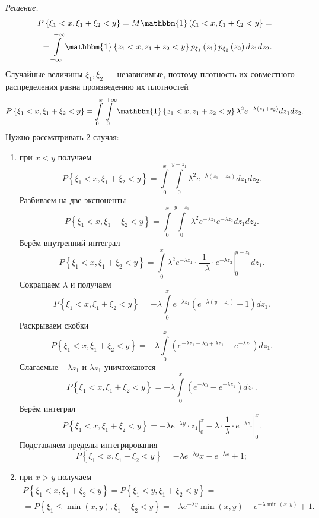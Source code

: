 \textit{Решение.} 
\begin{equation*}
\begin{split}
P \left\{ \xi_1 < x, \xi_1 + \xi_2 < y \right\} =
M \mathbbm{1} \left( \xi_1 < x, \xi_1 + \xi_2 < y \right\} = \\
= \int \limits_{- \infty }^{+ \infty } \mathbbm{1} \left\{ z_1 < x, z_1 + z_2 < y \right\} p_{ \xi_1} \left( z_1 \right) p_{ \xi_2} \left( z_2 \right) dz_1 dz_2.
\end{split}
\end{equation*}
Случайные величины $ \xi_1, \xi_2$ --- независимые, поэтому плотность их совместного распределения равна произведению их плотностей
$$P \left\{ \xi_1 < x, \xi_1 + \xi_2 < y \right\} =
\int \limits_0^x \int \limits_0^{+ \infty } \mathbbm{1} \left\{ z_1 < x, z_1 + z_2 < y \right\} \lambda^2 e^{- \lambda \left( z_1 + z_2 \right) } dz_1 dz_2.$$
Нужно рассматривать 2 случая:
\begin{enumerate}
\item при $x < y$ получаем
$$P \left\{ \xi_1 < x, \xi_1 + \xi_2 < y \right\} =
\int \limits_0^x \int \limits_0^{y - z_1} \lambda^2 e^{- \lambda \left( z_1 + z_2 \right) } dz_1 dz_2.$$
Разбиваем на две экспоненты
$$P \left\{ \xi_1 < x, \xi_1 + \xi_2 < y \right\} =
\int \limits_0^x \int \limits_0^{y-z_1} \lambda^2 e^{- \lambda z_1} e^{- \lambda z_2} dz_1 dz_2.$$
Берём внутренний интеграл
$$P \left\{ \xi_1 < x, \xi_1 + \xi_2 < y \right\} =
\int \limits_0^x \left. \lambda^2 e^{- \lambda z_1} \cdot \frac{1}{- \lambda } \cdot e^{- \lambda z_2} \right|_0^{y-z_1} dz_1.$$
Сокращаем $ \lambda $ и получаем
$$P \left\{ \xi_1 < x, \xi_1 + \xi_2 < y \right\} =
- \lambda \int \limits_0^x e^{- \lambda z_1} \left( e^{- \lambda \left( y-z_1 \right) } - 1 \right) dz_1.$$
Раскрываем скобки
$$P \left\{ \xi_1 < x, \xi_1 + \xi_2 < y \right\} =
- \lambda \int \limits_0^x \left( e^{- \lambda z_1 - \lambda y + \lambda z_1} - e^{- \lambda z_1} \right) dz_1.$$
Слагаемые $- \lambda z_1$ и $ \lambda z_1$ уничтожаются
$$P \left\{ \xi_1 < x, \xi_1 + \xi_2 < y \right\} =
- \lambda \int \limits_0^x \left( e^{- \lambda y} - e^{- \lambda z_1} \right) dz_1.$$
Берём интеграл
$$P \left\{ \xi_1 < x, \xi_1 + \xi_2 < y \right\} =
\left. - \lambda e^{- \lambda y} \cdot z_1 \right|_0^x - \left. \lambda \cdot \frac{1}{ \lambda } \cdot e^{- \lambda z_1} \right|_0^x.$$
Подставляем пределы интегрирования
$$P \left\{ \xi_1 < x, \xi_1 + \xi_2 < y \right\} =
- \lambda e^{- \lambda y} x - e^{- \lambda x} + 1;$$
\item при $x > y$ получаем
\begin{equation*}
\begin{split}
P \left\{ \xi_1 < x, \xi_1 + \xi_2 < y \right\} =
P \left\{ \xi_1 < y, \xi_1 + \xi_2 < y \right\} = \\
= P \left\{ \xi_1 \leq \min \left( x, y \right), \xi_1 + \xi_2 < y \right\} =
- \lambda e^{- \lambda y} \min \left( x, y \right) - e^{- \lambda \min \left( x, y \right) } + 1.
\end{split}
\end{equation*}
\end{enumerate}

